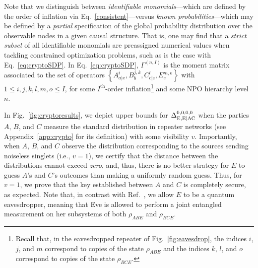 \documentclass[superscriptaddress,aps,prx,nofootinbib,twocolumn,twoside,reprint,letterpaper,longbibliography]{revtex4-2}
\begin{document}
Note that we distinguish between \emph{identifiable monomials}---which are defined by the order of inflation via Eq.~\eqref{consistent}---versus \emph{known probabilities}---which may be defined by a \emph{partial} specification of the global probability distribution over the observable nodes in a given causal structure. That is, one may find that a \emph{strict subset} of all identifiable monomials are preassigned numerical values when tackling constrained optimization problems, such as is the case with Eq.~\eqref{eq:cryptoSDP}.
In Eq.~\eqref{eq:cryptoSDP}, $\Gamma^{(n,I)}$ is the moment matrix associated to the set of operators $\left\{A^{i}_{a|x},B^{j,k}_b,C^{l}_{c|z},E^{m,o}_e\right\}$ with $1\leq i,j,k,l,m,o\leq I$, for some $I^\text{th}$-order inflation\footnote{Recall that, in the eavesdropped repeater of Fig.~\ref{fig:eavesdrop}, the indices $i$, $j$, and $m$ correspond to copies of the state $\rho_{ABE}$ and the indices $k$, $l$, and $o$ correspond to copies of the state $\rho_{BCE}$.} and some NPO hierarchy level $n$.

In Fig.~\ref{fig:cryptoresults}, we depict upper bounds for $\Delta_{\text{E},\text{E{\textbar}AC}}^{0,0,0,0}$ when the parties $A$, $B$, and $C$ measure the standard distribution in repeater networks (see Appendix~\ref{app:crypto} for its definition) with some visibility $v$.
Importantly, when $A$, $B$, and $C$ observe the distribution corresponding to the sources sending noiseless singlets (i.e., ${v{=}1}$), we certify that the distance between the distributions cannot exceed \emph{zero}, and, thus, there is no better strategy for $E$ to guess $A$'s and $C$'s outcomes than making a uniformly random guess.
Thus, for ${v{=}1}$, we prove that the key established between $A$ and $C$ is completely secure, as expected.
Note that, in contrast with Ref.~\cite{lee2018crypto}, we allow $E$ to be a quantum eavesdropper, meaning that Eve is allowed to perform a joint entangled measurement on her subsystems of both $\rho_{ABE}$ and $\rho_{BCE}$.
\end{document}
